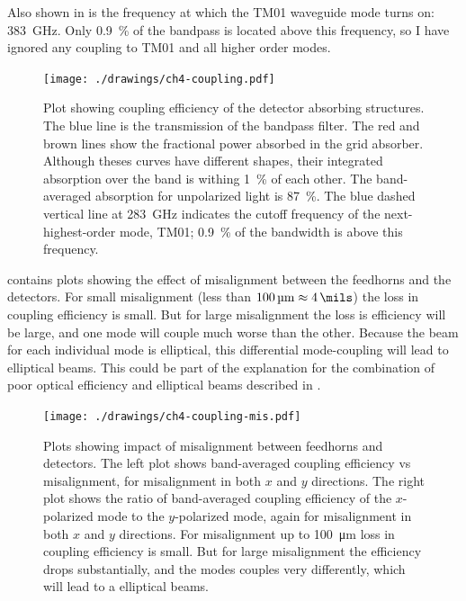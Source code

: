 Also shown in  is the frequency at which the TM01 waveguide mode turns on: \SI{383}{\GHz}.
Only \SI{0.9}{\percent} of the bandpass is located above this frequency, so I have ignored any coupling to TM01 and all higher order modes.

\begin{figure}
\centering
\texttt{[image: ./drawings/ch4-coupling.pdf]}
\caption{
  Plot showing coupling efficiency of the detector absorbing structures.
  The blue line is the transmission of the bandpass filter.
  The red and brown lines show the fractional power absorbed in the grid absorber.
  Although theses curves have different shapes, their integrated absorption over the band is withing \SI{1}{\percent} of each other.
  The band-averaged absorption for unpolarized light is \SI{87}{\percent}.
  The blue dashed vertical line at \SI{283}{\GHz} indicates the cutoff frequency of the next-highest-order mode, TM01; \SI{0.9}{\percent} of the bandwidth is above this frequency.
}
\label{fig:ch4-coupling}
\end{figure}

 contains plots showing the effect of misalignment between the feedhorns and the detectors.
For small misalignment (less than $\SI{100}{\um} \approx \SI{4}{\mils}$) the loss in coupling efficiency is small.
But for large misalignment the loss is efficiency will be large, and one mode will couple much worse than the other.
Because the beam for each individual mode is elliptical, this differential mode-coupling will lead to elliptical beams.
This could be part of the explanation for the combination of poor optical efficiency and elliptical beams described in .

\begin{figure}
\centering
\texttt{[image: ./drawings/ch4-coupling-mis.pdf]}
\caption{
  Plots showing impact of misalignment between feedhorns and detectors.
  The left plot shows band-averaged coupling efficiency vs misalignment, for misalignment in both $x$ and $y$ directions.
  The right plot shows the ratio of band-averaged coupling efficiency of the $x$-polarized mode to the $y$-polarized mode, again for misalignment in both $x$ and $y$ directions.
  For misalignment up to \SI{100}{\um} loss in coupling efficiency is small.
  But for large misalignment the efficiency drops substantially, and the modes couples very differently, which will lead to a elliptical beams.
}
\label{fig:ch4-coupling-mis}
\end{figure}

